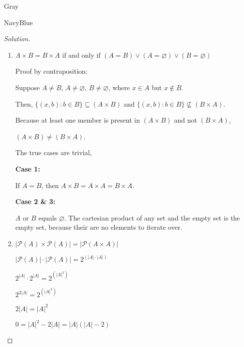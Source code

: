 \documentclass[12pt]{amsart}
\theoremstyle{named}
\newenvironment{soln}
{\begin{color}{Gray}\begin{framed}\begin{color}{NavyBlue}\begin{proof}[Solution]
\doublespacing}
{\end{proof}\end{color}\end{framed}\end{color}}
\theoremstyle{definition}
\begin{document}
\begin{soln} 
    \phantom{ }
    \begin{enumerate}
        \item $A\times B = B\times A$ if and only if $(A = B) \lor (A =
        \varnothing) \lor (B = \varnothing)$ 
        
        \noindent Proof by contraposition: 
        
        \begin{adjustwidth}{2em}{0em} 
            Suppose $A \neq B$, $A \neq \varnothing$, $B \neq \varnothing$, where $ x \in A $ but $x \notin
            B$. 
            
            \noindent Then, $\{(x,b) : b \in B \} \subseteq (A \times B)$ and
            $\{(x,b) : b \in B \} \nsubseteq (B \times A)$. 
            
            \noindent Because at least one member is present in $(A \times B)$
            and not $(B \times A)$,
            
            \noindent $(A \times B) \neq (B \times A)$. 
        \end{adjustwidth}

        \noindent The true cases are trivial,

        \noindent \textbf{Case 1:}
        \begin{adjustwidth}{2em}{0em}
            If $A = B$, then $A \times B = A \times A = B \times A$.
        \end{adjustwidth}
        
        \noindent \textbf{Case 2 \& 3:}
        \begin{adjustwidth}{2em}{0em}
            $A$ or $B$ equals $\varnothing$. The cartesian product of any set
        and the empty set is the empty set, because their are no elements to
        iterate over. 
        
        \end{adjustwidth}


        \item $|\mathscr P(A)\times\mathscr P(A)| = |\mathscr P(A\times A)|$ 
        
        \noindent$|\mathscr P(A)| \cdot |\mathscr P(A)| = 2^{(|A| \cdot |A|)}$

        \noindent$2^{|A|} \cdot 2^{|A|} = 2^{(|A|^{2})}$

        \noindent$2^{2|A|} = 2^{(|A|^{2})}$

        \noindent$2|A| = |A|^2$

        \noindent$0 = |A|^2 - 2|A| = |A|(|A| - 2)$


\end{enumerate}
\end{soln}
\end{document}
